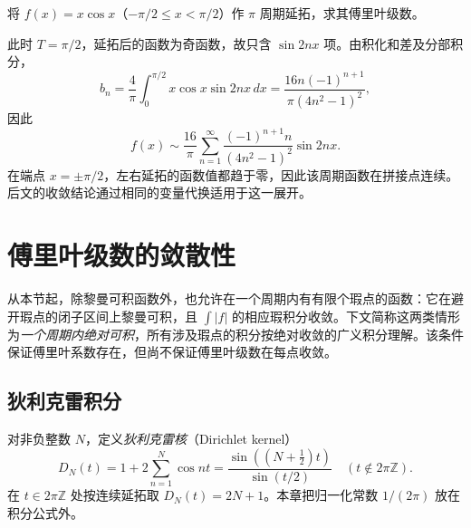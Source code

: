 \documentclass[UTF8,12pt,a4paper,fontset=fandol]{ctexbook}
\begin{document}
\begin{example}
\label{ex:fourier-x-cos-x-period-pi}
将 $f(x)=x\cos x$（$-\pi/2\leq x<\pi/2$）作 $\pi$ 周期延拓，求其傅里叶级数。
\end{example}

\begin{solve}
此时 $T=\pi/2$，延拓后的函数为奇函数，故只含 $\sin2nx$ 项。由积化和差及分部积分，
\[
    b_n=\frac4\pi\int_0^{\pi/2}x\cos x\sin2nx\,dx
       =\frac{16n(-1)^{n+1}}{\pi(4n^2-1)^2},
\]
因此
\begin{equation}
    f(x)\sim\frac{16}{\pi}\sum_{n=1}^\infty
             \frac{(-1)^{n+1}n}{(4n^2-1)^2}\sin2nx.
    \label{eq:fourier-x-cos-x-period-pi}
\end{equation}
在端点 $x=\pm\pi/2$，左右延拓的函数值都趋于零，因此该周期函数在拼接点连续。后文的收敛结论通过相同的变量代换适用于这一展开。
\end{solve}

\section{傅里叶级数的敛散性}
\label{sec:convergence-of-fourier-series}

从本节起，除黎曼可积函数外，也允许在一个周期内有有限个瑕点的函数：它在避开瑕点的闭子区间上黎曼可积，且 $\int|f|$ 的相应瑕积分收敛。下文简称这两类情形为\emph{一个周期内绝对可积}，所有涉及瑕点的积分按绝对收敛的广义积分理解。该条件保证傅里叶系数存在，但尚不保证傅里叶级数在每点收敛。

\subsection{狄利克雷积分}
\label{subsec:dirichlet-integral}

\begin{definition}
\label{def:dirichlet-kernel}
对非负整数 $N$，定义\emph{狄利克雷核}（Dirichlet kernel）
\begin{equation}
    D_N(t)=1+2\sum_{n=1}^N\cos nt
       =\frac{\sin((N+\tfrac12)t)}{\sin(t/2)}
       \quad(t\notin2\pi\mathbb Z).
    \label{eq:dirichlet-kernel}
\end{equation}
在 $t\in2\pi\mathbb Z$ 处按连续延拓取 $D_N(t)=2N+1$。本章把归一化常数 $1/(2\pi)$ 放在积分公式外。
\end{definition}
\end{document}
